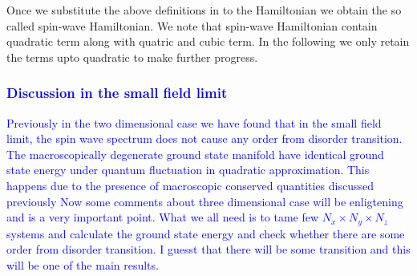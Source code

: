 \indent Once  we substitute the above definitions in to the Hamiltonian we obtain the so called spin-wave Hamiltonian. We note that spin-wave Hamiltonian contain quadratic term along with quatric and cubic term. In the following we only retain the terms upto quadratic to make further progress.\\

\subsubsection{\textcolor{blue}{Discussion in the small field limit}}
\textcolor{blue}{Previously in the two dimensional case we have found that in the small field limit, the spin wave spectrum does not cause any order from disorder transition. The macroscopically degenerate ground state manifold have identical ground state energy under quantum fluctuation in quadratic approximation. This happens due to the presence of macroscopic conserved quantities discussed previously \cite{vijigiri2018classical}Now some comments about three dimensional case will be enligtening and is a very important point. What we all need is to tame few $N_x \times N_y \times N_z$ systems and calculate the ground state energy and check whether there are some order from disorder transition. I guesst that there will be some transition and this will be one of the main results. }
